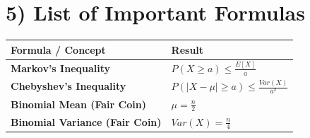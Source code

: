\documentclass[11pt]{article}
\begin{document}
\section*{5) List of Important Formulas}
\begin{table}[h!]
\centering
\renewcommand{\arraystretch}{1.5}
\setlength{\tabcolsep}{12pt}
\begin{tabular}{ll}
\toprule
\textbf{Formula / Concept} & \textbf{Result} \\
\midrule
\textbf{Markov’s Inequality} & $P(X \ge a) \le \frac{E[X]}{a}$ \\
\textbf{Chebyshev’s Inequality} & $P(|X - \mu| \ge a) \le \frac{Var(X)}{a^2}$ \\
\textbf{Binomial Mean (Fair Coin)} & $\mu = \frac{n}{2}$ \\
\textbf{Binomial Variance (Fair Coin)} & $Var(X) = \frac{n}{4}$ \\
\bottomrule
\end{tabular}
\end{table}
\end{document}
